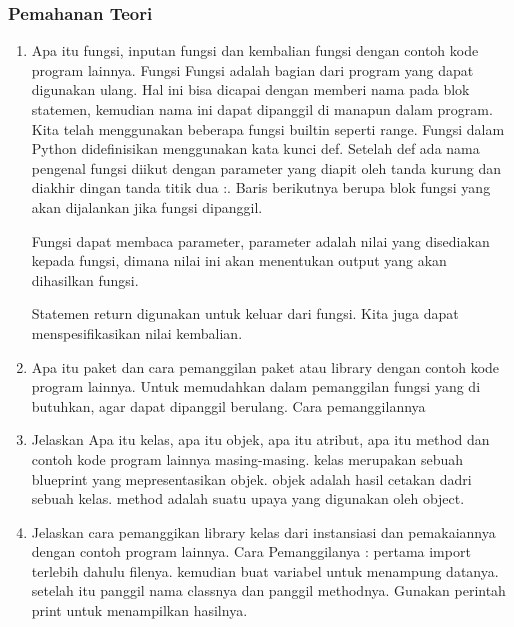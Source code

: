 \subsubsection{Pemahanan Teori}
\begin{enumerate}
\item Apa itu fungsi, inputan fungsi dan kembalian fungsi dengan contoh kode program
    lainnya.
    \subitem Fungsi Fungsi adalah bagian dari program yang dapat digunakan ulang. Hal ini bisa dicapai dengan memberi nama pada blok statemen, kemudian nama ini dapat dipanggil di manapun dalam program. Kita telah menggunakan beberapa fungsi builtin seperti range. Fungsi dalam Python didefinisikan menggunakan kata kunci def. Setelah def ada nama pengenal fungsi diikut dengan parameter yang diapit oleh tanda kurung dan diakhir dingan tanda titik dua :. Baris berikutnya berupa blok fungsi yang akan dijalankan jika fungsi dipanggil.
        

    \subitem Fungsi dapat membaca parameter, parameter adalah nilai yang disediakan kepada fungsi, dimana nilai ini akan menentukan output yang akan dihasilkan fungsi.
        

     \subitem Statemen return digunakan untuk keluar dari fungsi. Kita juga dapat menspesifikasikan nilai kembalian.
        

\item Apa itu paket dan cara pemanggilan paket atau library dengan contoh kode
    program lainnya.
    \subitem Untuk memudahkan dalam pemanggilan fungsi yang di butuhkan, agar dapat dipanggil berulang.
    Cara pemanggilannya
    

\item Jelaskan Apa itu kelas, apa itu objek, apa itu atribut, apa itu method dan contoh kode program lainnya masing-masing.
    kelas merupakan sebuah blueprint yang mepresentasikan objek.
    objek adalah hasil cetakan dadri sebuah kelas.
    method adalah suatu upaya yang digunakan oleh object.
    

\item Jelaskan cara pemanggikan library kelas dari instansiasi dan pemakaiannya dengan contoh program lainnya.
    Cara Pemanggilanya :
    \subitem pertama import terlebih dahulu filenya.
    \subitem kemudian buat variabel untuk menampung datanya.
    \subitem setelah itu panggil nama classnya dan panggil methodnya.
    \subitem Gunakan perintah print untuk menampilkan hasilnya.
      


\end{enumerate}
